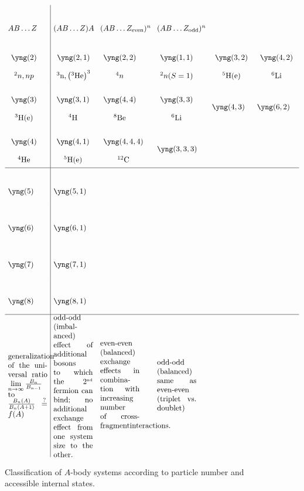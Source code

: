 \documentclass[aps,prd
,tightenlines,letterpaper,
nofootinbib]{revtex4-1}
\begin{document}
\begin{figure}
\[\arraycolsep=4pt\def\arraystretch{4}
\begin{array}{l|lllll}
AB\ldots Z &  (AB\ldots Z)A & (AB\ldots Z_\text{even})^n & (AB\ldots Z_\text{odd})^n & & \\
\duo{\yng(2) }{ {}^2n, np} &
\duo{\yng(2,1)}{ {}^3\text{n}, \left({}^3\text{He}\right)^3} &
\duo{\yng(2,2)}{ {}^4n} &
\duo{\yng(1,1)}{{}^2n(S=1)} &
\duo{\yng(3,2)}{{}^5\text{H(e)}} & 
\duo{\yng(4,2)}{{}^6\text{Li}} \\
\duo{\yng(3)}{ {}^3\text{H(e)}} &
\duo{\yng(3,1)}{{}^4\text{H}} &
\duo{\yng(4,4)}{{}^8\text{Be}} &
\duo{\yng(3,3)}{{}^6\text{Li}} &
\yng(4,3) &
\yng(6,2) \\
\duo{\yng(4)}{{}^4\text{He}} & 
\duo{\yng(4,1)}{{}^5\text{H(e)}} & 
\duo{\yng(4,4,4)}{{}^{12}\text{C}} & 
\yng(3,3,3) &  &  \\ \hline
\yng(5) & 
\yng(5,1) & &  &  &  \\
\yng(6) & 
\yng(6,1) & &  &  &  \\
\yng(7) & \yng(7,1) & &  &  &  \\
\yng(8) & \yng(8,1) & &  &  &  \\\hline
\begin{minipage}[c]{.15\textwidth}
generalization of the universal ratio $\lim\limits_{n\to\infty}\frac{B_n}{B_{n-1}}$ to
$\frac{B_n(A)}{B_{n}(A+1)}\stackrel{?}{=}f(A)$
\end{minipage} &
\begin{minipage}[c]{.15\textwidth} odd-odd (imbalanced)\\effect of additional bosons to which the $2^\text{\tiny nd}$ fermion can bind; no additional exchange effect from one system size to the other.
\end{minipage} &
\begin{minipage}[c]{.15\textwidth} even-even (balanced)\\exchange effects in combination
with increasing number of cross-fragmentinteractions.
\end{minipage} &
\begin{minipage}[c]{.15\textwidth}odd-odd (balanced) same as even-even (triplet vs. doublet)
\end{minipage} &
\begin{minipage}[c]{.15\textwidth}
\end{minipage} &
\begin{minipage}[c]{.15\textwidth}
\end{minipage} \\
\end{array}
\]\caption{\small Classification of $A$-body systems according to particle number and
accessible internal states.}
\end{figure}


\newpage


\end{document}
